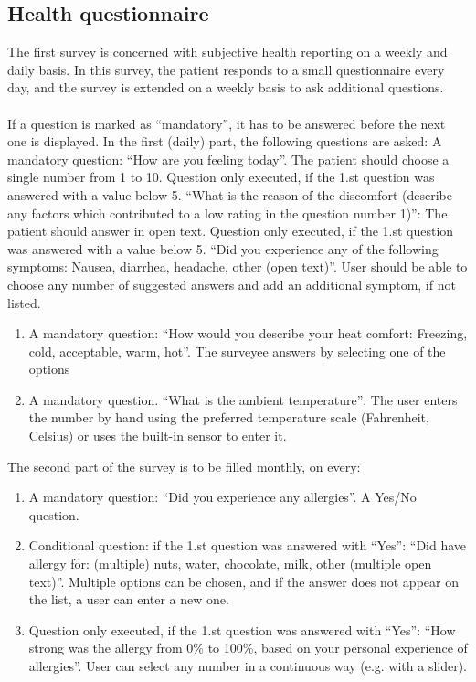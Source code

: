 \subsection{Health questionnaire}
The first survey is concerned with subjective health reporting on a weekly and daily basis. In this survey, the patient responds to a small questionnaire every day, and the survey is extended on a weekly basis to ask additional questions.\\\\
If a question is marked as ``mandatory'', it has to be answered before the next one is displayed.
In the first (daily) part, the following questions are asked:
A mandatory question: ``How are you feeling today''. The patient should choose a single number from 1 to 10.
Question only executed, if the 1.st question was answered with a value below 5. ``What is the reason of the discomfort (describe any factors which contributed to a low rating in the question number 1)'': The patient should answer in open text.
Question only executed, if the 1.st question was answered with a value below 5. ``Did you experience any of the following symptoms: Nausea, diarrhea, headache, other (open text)”. User should be able to choose any number of suggested answers and add an additional symptom, if not listed.
\begin{enumerate}
  \item A mandatory question: ``How would you describe your heat comfort: Freezing, cold, acceptable, warm, hot''. The surveyee answers by selecting one of the options
  \item A mandatory question. ``What is the ambient temperature'': The user enters the number by hand using the preferred temperature scale (Fahrenheit, Celsius) or uses the built-in sensor to enter it.
\end{enumerate}
\noindent
The second part of the survey is to be filled monthly, on every:

\begin{enumerate}

\item A mandatory question: ``Did you experience any allergies''. A Yes/No question.
\item Conditional question: if the 1.st question was answered with ``Yes'': ``Did have allergy for: (multiple) nuts, water, chocolate, milk, other (multiple open text)''. Multiple options can be chosen, and if the answer does not appear on the list, a user can enter a new one.
\item Question only executed, if the 1.st question was answered with ``Yes'': ``How strong was the allergy from 0\% to 100\%, based on your personal experience of allergies''. User can select any number in a continuous way (e.g. with a slider).
\end{enumerate}

